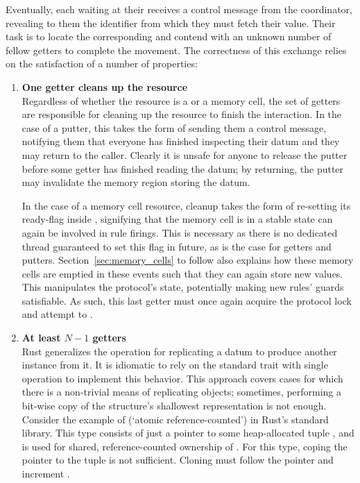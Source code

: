 Eventually, each  waiting at their  receives a control message from the coordinator, revealing to them the identifier from which they must fetch their value. Their task is to locate the corresponding  and contend with an unknown number of fellow getters to complete the movement. The correctness of this exchange relies on the satisfaction of a number of properties:
\begin{enumerate}
	\item \textbf{One getter cleans up the resource}\\
	Regardless of whether the resource is a  or a memory cell, the set of getters are responsible for cleaning up the resource to finish the interaction. In the case of a putter, this takes the form of sending them a control message, notifying them that everyone has finished inspecting their datum and they may return to the caller. Clearly it is unsafe for anyone to release the putter before some getter has finished reading the datum; by returning, the putter may invalidate the memory region storing the datum.
	
	In the case of a memory cell resource, cleanup takes the form of re-setting its ready-flag inside , signifying that the memory cell is in a stable state can again be involved in rule firings. This is necessary as there is no dedicated thread guaranteed to set this flag in future, as is the case for getters and putters. Section~\ref{sec:memory_cells} to follow also explains how these memory cells are emptied in these events such that they can again store new values. This manipulates the protocol's state, potentially making new rules' guards satisfiable. As such, this last getter must once again acquire the protocol lock and attempt to .
	
	\item \textbf{At least $N-1$ getters }\\
	Rust generalizes the operation for replicating a datum to produce another instance from it. It is idiomatic to rely on the standard trait  with single operation  to implement this behavior. This approach covers cases for which there is a non-trivial means of replicating objects; sometimes, performing a bit-wise copy of the structure's shallowest representation is not enough. Consider the example of  (`atomic reference-counted') in Rust's standard library. This type consists of just a pointer to some heap-allocated tuple , and is used for shared, reference-counted ownership of . For this type, coping the pointer to the tuple is not sufficient. Cloning must follow the pointer and increment .
	

\end{enumerate}
